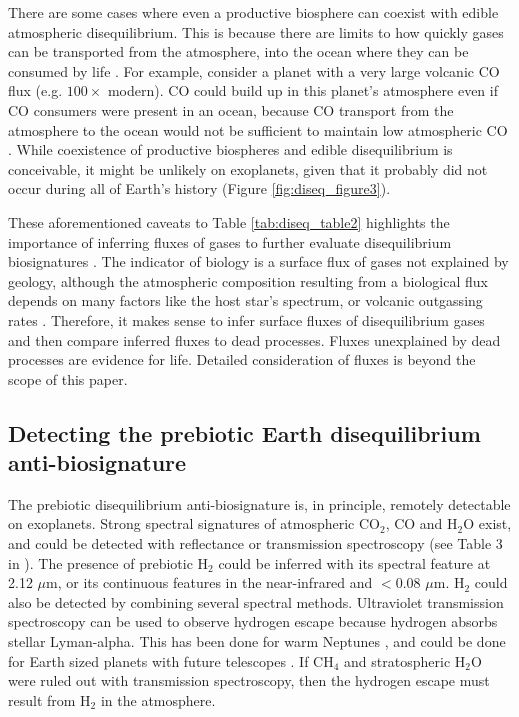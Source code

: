 There are some cases where even a productive biosphere can coexist with edible atmospheric disequilibrium. This is because there are limits to how quickly gases can be transported from the atmosphere, into the ocean where they can be consumed by life \citep{Kharecha_2005}. For example, consider a planet with a very large volcanic CO flux (e.g. $100\times$ modern). CO could build up in this planet's atmosphere even if CO consumers were present in an ocean, because CO transport from the atmosphere to the ocean would not be sufficient to maintain low atmospheric CO \citep{Schwieterman_2019}. While coexistence of productive biospheres and edible disequilibrium is conceivable, it might be unlikely on exoplanets, given that it probably did not occur during all of Earth's history (Figure \ref{fig:diseq_figure3}).

These aforementioned caveats to Table \ref{tab:diseq_table2} highlights the importance of inferring fluxes of gases to further evaluate disequilibrium biosignatures \citep{KrissansenTotton_2018_diseq,Simoncini_2013}. The indicator of biology is a surface flux of gases not explained by geology, although the atmospheric composition resulting from a biological flux depends on many factors like the host star's spectrum, or volcanic outgassing rates \citep{Segura_2005}. Therefore, it makes sense to infer surface fluxes of disequilibrium gases and then compare inferred fluxes to dead processes. Fluxes unexplained by dead processes are evidence for life. Detailed consideration of fluxes is beyond the scope of this paper.

\subsection{Detecting the prebiotic Earth disequilibrium anti-biosignature} \label{sec:diseq_44}

The prebiotic disequilibrium anti-biosignature is, in principle, remotely detectable on exoplanets. Strong spectral signatures of atmospheric CO$_2$, CO and H$_2$O exist, and could be detected with reflectance or transmission spectroscopy (see Table 3 in \citet{Catling_2018}). The presence of prebiotic H$_2$ could be inferred with its spectral feature at 2.12 $\mu$m, or its continuous features in the near-infrared and $< 0.08$ $\mu$m. H$_2$ could also be detected by combining several spectral methods. Ultraviolet transmission spectroscopy can be used to observe hydrogen escape because hydrogen absorbs stellar Lyman-alpha. This has been done for warm Neptunes \citep{Ehrenreich_2015}, and could be done for Earth sized planets with future telescopes \citep{Fujii_2018}. If CH$_4$ and stratospheric H$_2$O were ruled out with transmission spectroscopy, then the hydrogen escape must result from H$_2$ in the atmosphere. 

